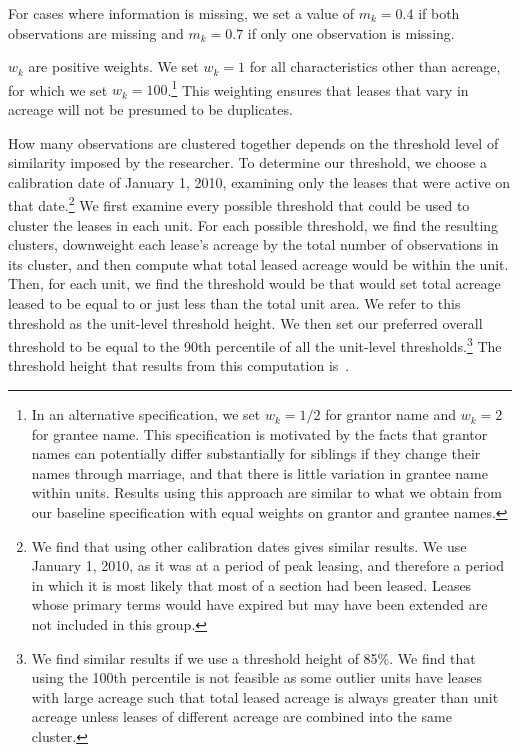 \documentclass[12pt]{article}
\begin{document}
For cases where information is missing, we set a value of $m_k = 0.4$ if both observations are missing and $m_k = 0.7$ if only one observation is missing.

$w_k$ are positive weights. We set $w_k = 1$ for all characteristics other than acreage, for which we set $w_k = 100$.\footnote{In an alternative specification, we set $w_k = 1/2$ for grantor name and $w_k = 2$ for grantee name. This specification is motivated by the facts that grantor names can potentially differ substantially for siblings if they change their names through marriage, and that there is little variation in grantee name within units. Results using this approach are similar to what we obtain from our baseline specification with equal weights on grantor and grantee names.} This weighting ensures that leases that vary in acreage will not be presumed to be duplicates.

How many observations are clustered together depends on the threshold level of similarity imposed by the researcher. To determine our threshold, we choose a calibration date of January 1, 2010, examining only the leases that were active on that date.\footnote{We find that using other calibration dates gives similar results. We use January 1, 2010, as it was at a period of peak leasing, and therefore a period in which it is most likely that most of a section had been leased. Leases whose primary terms would have expired but may have been extended are not included in this group.} We first examine every possible threshold that could be used to cluster the leases in each unit. For each possible threshold, we find the resulting clusters, downweight each lease's acreage by the total number of observations in its cluster, and then compute what total leased acreage would be within the unit. Then, for each unit, we find the threshold would be that would set total acreage leased to be equal to or just less than the total unit area. We refer to this threshold as the unit-level threshold height. We then set our preferred overall threshold to be equal to the 90th percentile of all the unit-level thresholds.\footnote{We find similar results if we use a threshold height of 85\%. We find that using the 100th percentile is not feasible as some outlier units have leases with large acreage such that total leased acreage is always greater than unit acreage unless leases of different acreage are combined into the same cluster.} The threshold height that results from this computation is~\unskip. 
\end{document}
